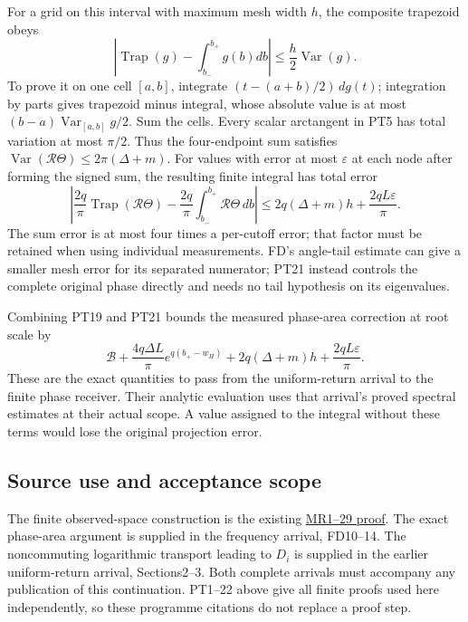\documentclass[10pt]{article}
\begin{document}
For a grid on this interval with maximum mesh width \(h\), the composite trapezoid obeys \[
 \left|\operatorname{Trap}(g)-\int_{b_-}^{b_+}g(b)db\right|
 \le\frac h2\operatorname{Var}(g).
 \tag{PT20}
\] To prove it on one cell \([a,b]\), integrate \((t-(a+b)/2)\,dg(t)\); integration by parts gives trapezoid minus integral, whose absolute value is at most \((b-a)\operatorname{Var}_{[a,b]}g/2\). Sum the cells. Every scalar arctangent in PT5 has total variation at most \(\pi/2\). Thus the four-endpoint sum satisfies \(\operatorname{Var}(\mathcal R\Theta)\le2\pi(\Delta+m)\). For values with error at most \(\varepsilon\) at each node after forming the signed sum, the resulting finite integral has total error \[
 \left|\frac{2q}{\pi}\operatorname{Trap}(\mathcal R\Theta)
       -\frac{2q}{\pi}\int_{b_-}^{b_+}\mathcal R\Theta\,db\right|
 \le2q(\Delta+m)h+\frac{2qL\varepsilon}{\pi}.
 \tag{PT21}
\] The sum error is at most four times a per-cutoff error; that factor must be retained when using individual measurements. FD's angle-tail estimate can give a smaller mesh error for its separated numerator; PT21 instead controls the complete original phase directly and needs no tail hypothesis on its eigenvalues.

Combining PT19 and PT21 bounds the measured phase-area correction at root scale by \[
 \mathcal B+\frac{4q\Delta L}{\pi}e^{q(b_+-w_H)}
 +2q(\Delta+m)h+\frac{2qL\varepsilon}{\pi}.
 \tag{PT22}
\] These are the exact quantities to pass from the uniform-return arrival to the finite phase receiver. Their analytic evaluation uses that arrival's proved spectral estimates at their actual scope. A value assigned to the integral without these terms would lose the original projection error.

\subsection{Source use and acceptance scope}\label{source-use-and-acceptance-scope}

The finite observed-space construction is the existing \href{https://github.com/KokunoYumeto/zeta-function-research-reader/blob/e40b46fde72c245dd79ef5691f59c21d6cbf0c75/workbenches/splitzero-tandem/continuations/20260922-original-observation-recovery/MATRIX_RECOVERY_PROOFS.md\#L7}{MR1--29 proof}. The exact phase-area argument is supplied in the frequency arrival, FD10--14. The noncommuting logarithmic transport leading to \(D_i\) is supplied in the earlier uniform-return arrival, Sections2--3. Both complete arrivals must accompany any publication of this continuation. PT1--22 above give all finite proofs used here independently, so these programme citations do not replace a proof step.
\end{document}
